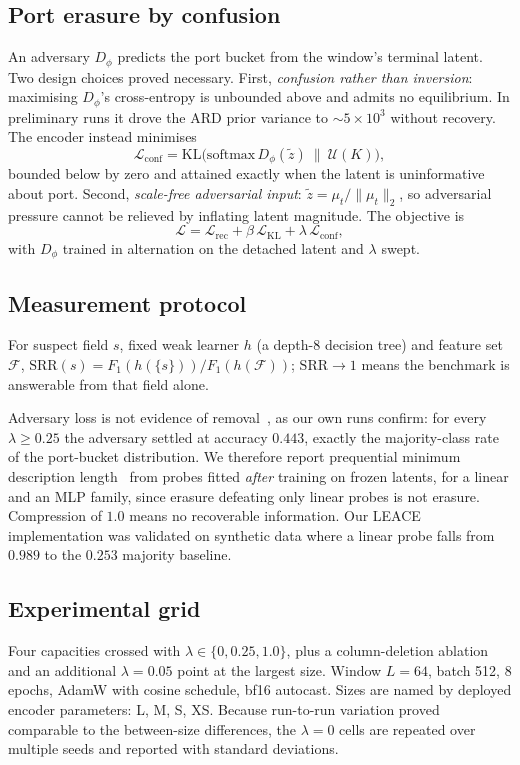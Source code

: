 \documentclass[conference]{IEEEtran}
\begin{document}
\subsection{Port erasure by confusion}
An adversary $D_\phi$ predicts the port bucket from the window's terminal latent. Two design
choices proved necessary. First, \emph{confusion rather than inversion}: maximising
$D_\phi$'s cross-entropy is unbounded above and admits no equilibrium. In preliminary runs
it drove the ARD prior variance to ${\sim}5\times10^{3}$ without recovery. The encoder
instead minimises
\begin{equation}
\mathcal{L}_{\text{conf}} = \mathrm{KL}\big(\mathrm{softmax}\,D_\phi(\tilde{z})\ \|\ \mathcal{U}(K)\big),
\end{equation}
bounded below by zero and attained exactly when the latent is uninformative about port.
Second, \emph{scale-free adversarial input}: $\tilde{z} = \mu_t/\lVert\mu_t\rVert_2$, so
adversarial pressure cannot be relieved by inflating latent magnitude. The objective is
\begin{equation}
\mathcal{L} = \mathcal{L}_{\text{rec}} + \beta\,\mathcal{L}_{\text{KL}} + \lambda\,\mathcal{L}_{\text{conf}},
\end{equation}
with $D_\phi$ trained in alternation on the detached latent and $\lambda$ swept.

\subsection{Measurement protocol}
For suspect field $s$, fixed weak learner $h$ (a depth-8 decision tree) and feature set
$\mathcal{F}$, $\mathrm{SRR}(s) = F_1(h(\{s\}))/F_1(h(\mathcal{F}))$; $\mathrm{SRR}\to1$
means the benchmark is answerable from that field alone.

Adversary loss is not evidence of removal~\cite{kumar2022probing}, as our own runs confirm:
for every $\lambda\geq0.25$ the adversary settled at accuracy $0.443$, exactly the
majority-class rate of the port-bucket distribution. We therefore report prequential
minimum description length~\cite{voita2020mdl} from probes fitted \emph{after} training on
frozen latents, for a linear and an MLP family, since erasure defeating only linear probes
is not erasure. Compression of $1.0$ means no recoverable information. Our
LEACE~\cite{belrose2023leace} implementation was validated on synthetic data where a linear
probe falls from $0.989$ to the $0.253$ majority baseline.

\subsection{Experimental grid}
Four capacities crossed with $\lambda \in \{0, 0.25, 1.0\}$, plus a column-deletion
ablation and an additional $\lambda = 0.05$ point at the largest size. Window $L=64$, batch
512, 8 epochs, AdamW with cosine schedule, bf16 autocast. Sizes are named by deployed encoder
parameters: L, M, S, XS. Because run-to-run variation proved comparable to the between-size
differences, the $\lambda=0$ cells are repeated over multiple seeds and reported with
standard deviations.
\end{document}
